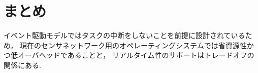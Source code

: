 \section{まとめ}


イベント駆動モデルではタスクの中断をしないことを前提に設計されているため，
現在のセンサネットワーク用のオペレーティングシステムでは省資源性かつ低オーバヘッドであることと，
リアルタイム性のサポートはトレードオフの関係にある.






